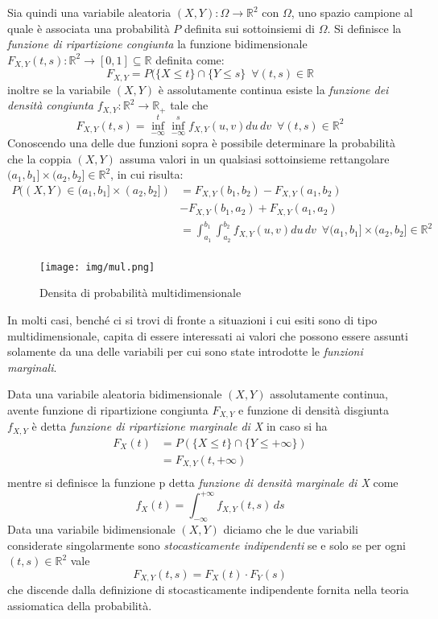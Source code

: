 \documentclass[a4paper,12pt, oneside]{book}
\newcommand{\numberset}{\mathbb}
\newcommand{\R}{\numberset{R}}
\begin{document}
Sia quindi una variabile aleatoria $(X, Y): \Omega \to \R ^ 2$ con $\Omega$, uno spazio campione 
al quale è associata una probabilità $P$ definita sui sottoinsiemi di $\Omega$.\newline
Si definisce la \emph{funzione di ripartizione congiunta} la funzione bidimensionale 
$F_{X, Y}(t, s):\R ^2 \to [0,1] \subseteq \R$ definita come:
\[F_{X, Y} = P(\{X \leq t\} \cap \{Y \leq s\}\,\,\,\forall (t,s)\in \R\]
inoltre se la variabile $(X,Y)$ è assolutamente continua esiste la \emph{funzione dei densità congiunta}
$f_{X, Y}:\R ^2 \to \R_+$ tale che
\[F_{X, Y}(t, s) = \inf_{-\infty}^t \inf_{-\infty}^s f_{X, Y}(u, v)du\,dv\,\,\,\forall (t, s)\in \R ^2\]
Conoscendo una delle due funzioni sopra è possibile determinare la probabilità che la coppia $(X,Y)$ assuma
valori in un qualsiasi sottoinsieme rettangolare $(a_1, b_1] \times (a_2, b_2] \in \R^2$, in cui risulta:
\[ \begin{split}
    P((X, Y) \in (a_1, b_1] \times (a_2, b_2]) & = F_{X, Y} (b_1, b_2) - F_{X, Y}(a_1, b_2)\\ 
                                               & - F_{X, Y} (b_1, a_2) + F_{X, Y}(a_1, a_2) \\
    & = \int_{a_1}^{b_1} \int_{a_2}^{b_2} f_{X, Y}(u, v) du\,dv\,\,\, \forall (a_1, b_1] \times(a_2, b_2] \in \R^2\\
   \end{split}\]

\begin{figure}
    \caption{Densita di probabilità multidimensionale}
    \label{img:densitaMulti}
    \texttt{[image: img/mul.png]}
\end{figure}
In molti casi, benché ci si trovi di fronte a situazioni i cui esiti sono di tipo multidimensionale, 
capita di essere interessati ai valori che possono essere assunti solamente da una delle variabili per cui 
sono state introdotte le \emph{funzioni marginali}.

Data una variabile aleatoria bidimensionale $(X, Y)$ assolutamente continua, avente 
funzione di ripartizione congiunta $F_{X, Y}$ e funzione di densità disgiunta $f_{X, Y}$ è detta 
\emph{funzione di ripartizione marginale di X} in caso si ha
\[ \begin{split}
    F_X(t) & = P(\{X \leq t\} \cap \{Y \leq +\infty\})\\
           & = F_{X, Y}(t, +\infty)\\
   \end{split}\]
mentre si definisce la funzione p detta \emph{funzione di densità marginale di X} come
\[f_X(t) = \int_{-\infty}^{+\infty} f_{X, Y}(t, s)\,ds\]
Data una variabile bidimensionale $(X, Y)$ diciamo che le due variabili considerate singolarmente 
sono \emph{stocasticamente indipendenti} se e solo se per ogni $(t, s) \in \R^2$ vale
\[F_{X, Y}(t, s) = F_X(t) \cdot F_Y(s)\]
che discende dalla definizione di stocasticamente indipendente fornita nella teoria assiomatica della probabilità.
\end{document}
